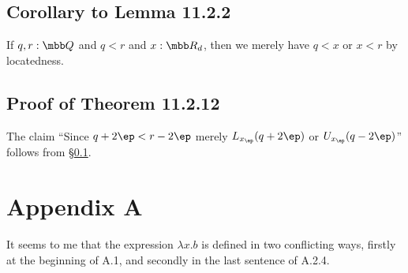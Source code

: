 \documentclass[12pt]{article}
\begin{document}

\subsection{Corollary to Lemma 11.2.2}\label{1122}

If $q,r:\mbb Q$ and $q<r$ and $x:\mbb R_d$, then we merely have $q<x$ or $x<r$ by locatedness.

\subsection{Proof of Theorem 11.2.12}

The claim ``Since $q+2\ep<r-2\ep$ merely $L_{x_\ep}(q+2\ep)$ or $U_{x_\ep}(q-2\ep)$'' follows from \S\ref{1122}.


\section{Appendix A}

It seems to me that the expression $\lambda x.b$ is defined in two conflicting ways, firstly at the beginning of A.1, and secondly in the last sentence of A.2.4. 
\end{document}
